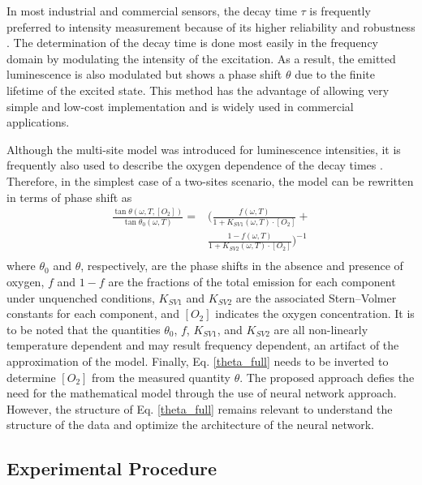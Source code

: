 \documentclass[9pt,twocolumn,twoside,pdftex]{optica}
\begin{document}
In most industrial and commercial sensors, the decay time $\tau$ is frequently preferred to intensity measurement because of its higher reliability and robustness \cite{Wei2019}. The determination of the decay time is done most easily in the frequency domain by modulating the intensity of the excitation.  As a result, the emitted luminescence is also modulated but shows a phase shift $\theta$ due to the finite lifetime of the excited state. This method has the advantage of allowing very simple and low-cost implementation and is widely used in commercial applications.

Although the multi-site model was introduced for luminescence intensities, it is frequently also used to describe the oxygen dependence of the decay times \cite{Demas1995,Quaranta2012}. Therefore, in the simplest case of a two-sites scenario, the model can be rewritten in terms of phase shift as \cite{Michelucci2019}
\begin{equation}
\begin{aligned}
\frac{\tan \theta (\omega, T, [O_2])}{\tan \theta_0 (\omega, T)} =& \bigg( \frac{f (\omega , T) }{1+K_{SV1} (\omega , T) \cdot \left[O_2\right]}+ \\
&\frac{1-f (\omega , T) }{1+K_{SV2} (\omega , T) \cdot \left[O_2\right]} \bigg)^{-1} \\
\label{theta_full}
\end{aligned}
\end{equation}
where $\theta_0$ and $\theta$, respectively, are the phase shifts in the absence and presence of oxygen, $f$ and $1-f$ are the fractions of the total emission for each component under unquenched conditions, $K_{SV1}$ and $K_{SV2}$ are the associated Stern–Volmer constants for each component, and $\left[O_2\right]$ indicates the oxygen concentration. It is to be noted that the quantities $\theta_0$, $f$, $K_{SV1}$, and $K_{SV2}$ are all non-linearly temperature dependent \cite{Ogurtsov2006,lo2008,Zaitsev2016} and may result frequency dependent, an artifact of the approximation of the model. Finally, Eq. \ref{theta_full} needs to be inverted to determine $[O_2]$ from the measured quantity $\theta$. The proposed approach defies the need for the mathematical model through the use of neural network approach. However, the structure of Eq. \ref{theta_full} remains relevant to understand the structure of the data and optimize the architecture of the neural network.


\subsection{Experimental Procedure}
\label{Experimental}
\end{document}
